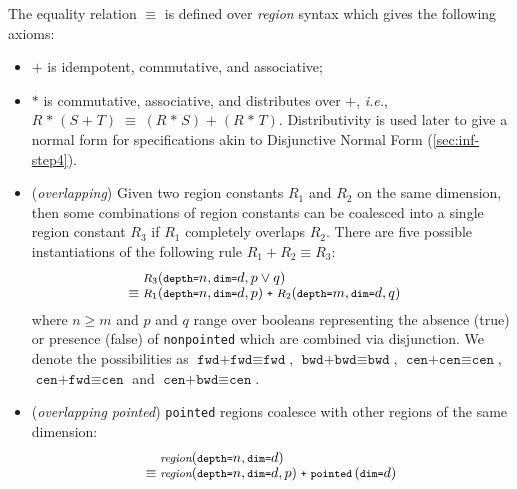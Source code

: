 \documentclass[10pt,preprint,numbers]{sigplanconf}
\theoremstyle{definition}
\newcommand{\ie}{\emph{i.e.}}
\newcommand{\term}[1]{\texttt{#1}}
\newcommand{\irrefl}{\texttt{nonpointed}}
\newcommand{\stenReflS}[1]{\term{pointed} \, (\term{dim=}#1)}
\begin{document}
The equality relation $\equiv$ is defined over \emph{region}
syntax which gives the following axioms:
%
\begin{itemize}
\item $\term{+}$ is idempotent, commutative, and associative;
\item $\term{*}$ is commutative, associative, and distributes over
$\term{+}$, \ie{},  $R \; \texttt{*} \; (S \; \texttt{+} \; T) \; \equiv \; (R \;
                       \texttt{*} \; S) \; \texttt{+} \; (R
                       \; \texttt{*} \; T)$.
Distributivity is
used later to give a normal form for specifications
akin to Disjunctive Normal Form (\cref{sec:inf-step4}).

\item (\emph{overlapping}) Given two region constants $R_1$ and $R_2$
on the same dimension, then some combinations of region constants
can be coalesced into a single region constant $R_3$ if $R_1$ completely
overlaps $R_2$. There are five possible instantiations of the
following rule $R_1 + R_2 \equiv R_3$:
%
\newcommand{\stenGR}[4]{\small{\textit{#4}(\term{depth=}#1,
  \term{dim=}#2, #3)}}
\newcommand{\stenG}[3]{\small{\textit{#3}(\term{depth=}#1,
  \term{dim=}#2)}}
%
\vspace{-0.2em}
\begin{align*}
\hspace{-1em} & \stenGR{n}{d}{p \vee q}{$R_3$} \\[-0.4em]
\hspace{-1em} \equiv \; & \stenGR{n}{d}{p}{$R_1$} \; \texttt{+} \; \stenGR{m}{d}{q}{$R_2$}
\end{align*}
where $n \geq m$ and $p$ and $q$ range
over booleans representing the absence (true) or presence (false)
of \irrefl{} which are combined via disjunction.
We denote the possibilities as $\term{fwd+fwd} \equiv \term{fwd}$, $\term{bwd+bwd} \equiv \term{bwd}$,
$\term{cen+cen} \equiv \term{cen}$, $\term{cen+fwd} \equiv \term{cen}$ and
$\term{cen+bwd} \equiv \term{cen}$. %

\item (\textit{overlapping pointed}) \term{pointed} regions coalesce
  with other regions of the same dimension:
%
\vspace{-0.4em}
\begin{align*}
& \stenG{n}{d}{region} \\[-0.4em]
\equiv \; & \stenGR{n}{d}{p}{region} \; \texttt{+} \;
                          \stenReflS{d}
\end{align*}
\vspace{-1.5em}


\end{itemize}
\end{document}
